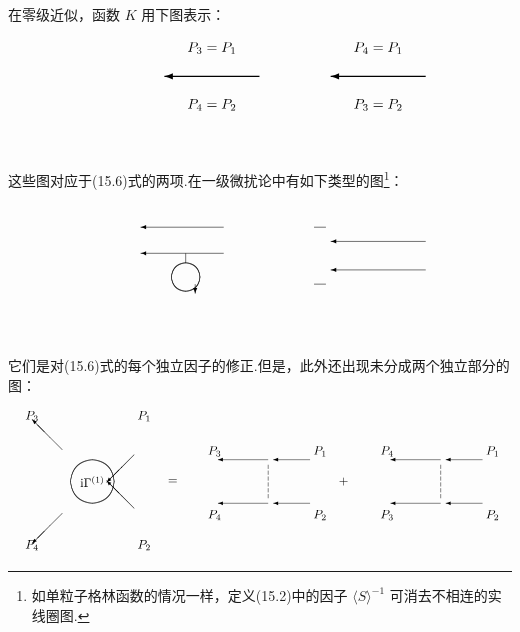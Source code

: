 在零级近似，函数 $K$ 用下图表示：
\begin{equation*}
  \setlength{\unitlength}{0.85pt}%
  \begin{picture}(320,100)(0,0)
    \put(120,88){\makebox(0,0){$P_3=P_1$}}%
    \tarrL{160}{64}{80}%
    \put(120,40){\makebox(0,0){$P_4=P_2$}}%
    \put(260,88){\makebox(0,0){$P_4=P_1$}}%
    \tarrL{300}{64}{80}%
    \put(260,40){\makebox(0,0){$P_3=P_2$}}%
  \end{picture}
\end{equation*}
这些图对应于(15.6)式的两项.在一级微扰论中有如下类型的图\footnote{如单粒子格林函数的情况一样，定义(15.2)中的因子 $\langle\hat{S}\rangle^{-1}$ 可消去不相连的实线圈图.}：
\begin{equation*}
  \setlength{\unitlength}{0.85pt}%
  \begin{picture}(360,120)(0,0)
    \arrL{150}{96}{70}%
    \arrL{150}{74}{70}%
    \put(118,74){\line(0,-1){8}}%
    \qbezier(118,42)(128.968,43.032)(130,54)%
    \qbezier(130,54)(128.968,64.968)(118,66)%
    \qbezier(118,66)(107.032,64.968)(106,54)%
    \qbezier(106,54)(107.032,43.032)(118,42)%
    \put(126,48){\vector(0,-1){8}}%
    \put(212,84){\line(1,1){10}}%
    \put(226,96){\line(1,0){10}}%
    \put(240,94){\line(1,-1){10}}%
    \put(212,60){\line(1,-1){10}}%
    \put(226,48){\line(1,0){10}}%
    \put(240,50){\line(1,1){10}}%
    \arrL{320}{84}{80}%
    \arrL{320}{60}{80}%
  \end{picture}
\end{equation*}
它们是对(15.6)式的每个独立因子的修正.但是，此外还出现未分成两个独立部分的图：
\begin{equation}
  \setlength{\unitlength}{0.68pt}%
  \begin{picture}(600,175)(0,0)
    \put(64,120){\vector(-1,1){36}}%
    \put(64,44){\vector(-1,-1){36}}%
    \qbezier(100,56)(123.764,58.236)(126,82)%
    \qbezier(126,82)(123.764,105.764)(100,108)%
    \qbezier(100,108)(76.236,105.764)(74,82)%
    \qbezier(74,82)(76.236,58.236)(100,56)%
    \put(100,82){\makebox(0,0){$\mathrm{i}\Gamma^{(1)}$}}%
    \put(150,114){\vector(-1,-1){33}}%
    \put(150,50){\vector(-1,1){33}}%
    \put(28,160){\makebox(0,0){$P_3$}}%
    \put(162,160){\makebox(0,0){$P_1$}}%
    \put(28,6){\makebox(0,0){$P_4$}}%
    \put(162,6){\makebox(0,0){$P_2$}}%
    \put(196,82){\makebox(0,0){$=$}}%
    \arrL{310}{108}{60}%
    \arrL{360}{108}{44}%
    \dvh{310}{62}{6}%
    \arrL{310}{56}{60}%
    \arrL{360}{56}{44}%
    \put(246,118){\makebox(0,0){$P_3$}}%
    \put(372,118){\makebox(0,0){$P_1$}}%
    \put(246,42){\makebox(0,0){$P_4$}}%
    \put(372,42){\makebox(0,0){$P_2$}}%
    \put(400,82){\makebox(0,0){$+$}}%
    \arrL{516}{108}{60}%
    \arrL{566}{108}{44}%
    \dvh{516}{62}{6}%
    \arrL{516}{56}{60}%
    \arrL{566}{56}{44}%
    \put(452,118){\makebox(0,0){$P_4$}}%
    \put(578,118){\makebox(0,0){$P_1$}}%
    \put(452,42){\makebox(0,0){$P_3$}}%
    \put(578,42){\makebox(0,0){$P_2$}}%
  \end{picture}
\end{equation}
